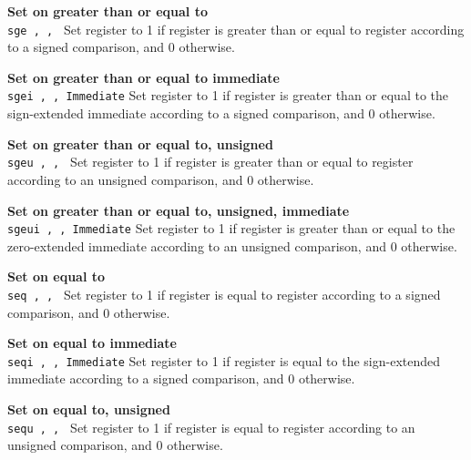 \noindent
{\bf Set on greater than or equal to}\\
\noindent
\texttt{sge \regd, \regs, \regt}
Set register \regd{} to 1 if register \regs{} is
greater than or equal to register \regt{} according to a signed comparison, and 0 otherwise.
\vspace{3ex}

\noindent
{\bf Set on greater than or equal to immediate}\\
\noindent
\texttt{sgei \regd, \regs, Immediate}
Set register \regd{} to 1 if register \regs{} is
greater than or equal to the sign-extended immediate according to a signed comparison, and 0 otherwise.
\vspace{3ex}

\noindent
{\bf Set on greater than or equal to, unsigned}\\
\noindent
\texttt{sgeu \regd, \regs, \regt}
Set register \regd{} to 1 if register \regs{} is
greater than or equal to register \regt{} according to an unsigned comparison, and 0 otherwise.
\vspace{3ex}

\noindent
{\bf Set on greater than or equal to, unsigned, immediate}\\
\noindent
\texttt{sgeui \regd, \regs, Immediate}
Set register \regd{} to 1 if register \regs{} is
greater than or equal to the zero-extended immediate according to an unsigned comparison, and 0 otherwise.
\vspace{3ex}
\newpage

\noindent
{\bf Set on equal to}\\
\noindent
\texttt{seq \regd, \regs, \regt}
Set register \regd{} to 1 if register \regs{} is
equal to register \regt{} according to a signed comparison, and 0 otherwise.
\vspace{3ex}

\noindent
{\bf Set on equal to immediate}\\
\noindent
\texttt{seqi \regd, \regs, Immediate}
Set register \regd{} to 1 if register \regs{} is
equal to the sign-extended immediate according to a signed comparison, and 0 otherwise.
\vspace{3ex}

\noindent
{\bf Set on equal to, unsigned}\\
\noindent
\texttt{sequ \regd, \regs, \regt}
Set register \regd{} to 1 if register \regs{} is
equal to register \regt{} according to an unsigned comparison, and 0 otherwise.
\vspace{3ex}

